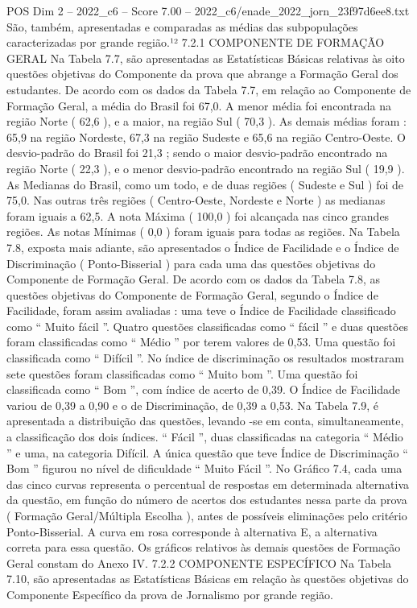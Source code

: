 \begin{textsample}{POS Dim 2 – 2022\_c6 – Score 7.00 – 2022\_c6/enade\_2022\_jorn\_23f97d6ee8.txt}
São, também, apresentadas e comparadas as médias das subpopulações caracterizadas por grande região.¹² 7.2.1 COMPONENTE DE FORMAÇÃO GERAL Na Tabela 7.7, são apresentadas as Estatísticas Básicas relativas às oito questões objetivas do Componente da prova que abrange a Formação Geral dos estudantes.
De acordo com os dados da Tabela 7.7, em relação ao Componente de Formação Geral, a média do Brasil foi 67,0.
A menor média foi encontrada na região Norte ( 62,6 ), e a maior, na região Sul ( 70,3 ).
As demais médias foram : 65,9 na região Nordeste, 67,3 na região Sudeste e 65,6 na região Centro-Oeste.
O desvio-padrão do Brasil foi 21,3 ; sendo o maior desvio-padrão encontrado na região Norte ( 22,3 ), e o menor desvio-padrão encontrado na região Sul ( 19,9 ).
As Medianas do Brasil, como um todo, e de duas regiões ( Sudeste e Sul ) foi de 75,0.
Nas outras três regiões ( Centro-Oeste, Nordeste e Norte ) as medianas foram iguais a 62,5.
A nota Máxima ( 100,0 ) foi alcançada nas cinco grandes regiões.
As notas Mínimas ( 0,0 ) foram iguais para todas as regiões.
Na Tabela 7.8, exposta mais adiante, são apresentados o Índice de Facilidade e o Índice de Discriminação ( Ponto-Bisserial ) para cada uma das questões objetivas do Componente de Formação Geral.
De acordo com os dados da Tabela 7.8, as questões objetivas do Componente de Formação Geral, segundo o Índice de Facilidade, foram assim avaliadas : uma teve o Índice de Facilidade classificado como “ Muito fácil ”.
Quatro questões classificadas como “ fácil ” e duas questões foram classificadas como “ Médio ” por terem valores de 0,53.
Uma questão foi classificada como “ Difícil ”.
No índice de discriminação os resultados mostraram sete questões foram classificadas como “ Muito bom ”.
Uma questão foi classificada como “ Bom ”, com índice de acerto de 0,39.
O Índice de Facilidade variou de 0,39 a 0,90 e o de Discriminação, de 0,39 a 0,53.
Na Tabela 7.9, é apresentada a distribuição das questões, levando -se em conta, simultaneamente, a classificação dos dois índices. “ Fácil ”, duas classificadas na categoria “ Médio ” e uma, na categoria Difícil.
A única questão que teve Índice de Discriminação “ Bom ” figurou no nível de dificuldade “ Muito Fácil ”.
No Gráfico 7.4, cada uma das cinco curvas representa o percentual de respostas em determinada alternativa da questão, em função do número de acertos dos estudantes nessa parte da prova ( Formação Geral/Múltipla Escolha ), antes de possíveis eliminações pelo critério Ponto-Bisserial.
A curva em rosa corresponde à alternativa E, a alternativa correta para essa questão.
Os gráficos relativos às demais questões de Formação Geral constam do Anexo IV. 7.2.2 COMPONENTE ESPECÍFICO Na Tabela 7.10, são apresentadas as Estatísticas Básicas em relação às questões objetivas do Componente Específico da prova de Jornalismo por grande região.

\end{textsample}

